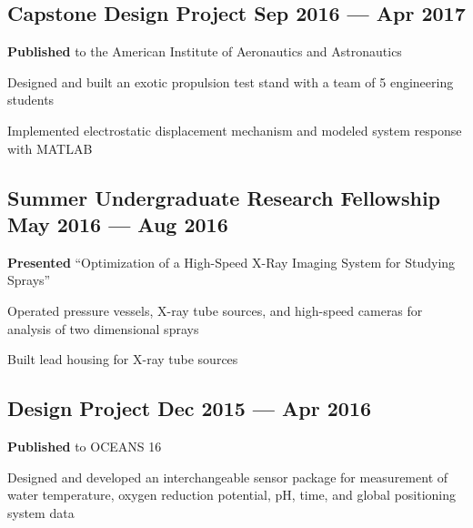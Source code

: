 \subsection{{Capstone Design Project \hfill Sep 2016 --- Apr 2017}}
\begin{zitemize}
\item \textbf{Published} to the American Institute of Aeronautics and Astronautics
\item Designed and built an exotic propulsion test stand with a team of 5 engineering students
\item Implemented electrostatic displacement mechanism and modeled system response with MATLAB
\end{zitemize}

\subsection{{Summer Undergraduate Research Fellowship \hfill May 2016 --- Aug 2016}}
\begin{zitemize}
\item \textbf{Presented} ``Optimization of a High-Speed X-Ray Imaging System for Studying Sprays''
\item Operated pressure vessels, X-ray tube sources, and high-speed cameras for analysis of two dimensional sprays
\item Built lead housing for X-ray tube sources
\end{zitemize}

\newpage

\subsection{{Design Project \hfill Dec 2015 --- Apr 2016}}
\begin{zitemize}
\item \textbf{Published} to OCEANS 16
\item Designed and developed an interchangeable sensor package for measurement of water temperature, oxygen reduction potential, pH, time, and global positioning system data
\end{zitemize}

